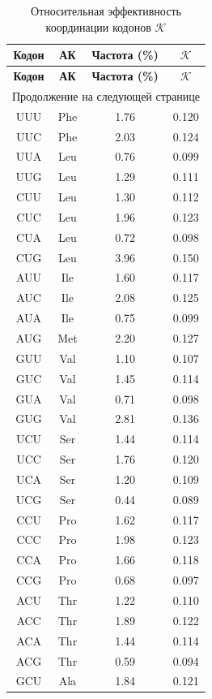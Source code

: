 \documentclass[12pt,a4paper]{article}
\newcommand{\REL}{\mathcal{K}}          %
\begin{document}
	\begin{longtable}{|c|c|c|c|}
		\caption{Относительная эффективность координации кодонов \(\REL\)}\label{tab:codons}\\
		\hline
		\textbf{Кодон} & \textbf{АК} & \textbf{Частота (\%)} & \(\REL\) \\
		\hline
		\endfirsthead
		\hline
		\textbf{Кодон} & \textbf{АК} & \textbf{Частота (\%)} & \(\REL\) \\
		\hline
		\endhead
		\hline
		\multicolumn{4}{r}{Продолжение на следующей странице}\\
		\endfoot
		\hline
		\endlastfoot
		UUU & Phe & 1.76 & 0.120 \\
		UUC & Phe & 2.03 & 0.124 \\
		UUA & Leu & 0.76 & 0.099 \\
		UUG & Leu & 1.29 & 0.111 \\
		CUU & Leu & 1.30 & 0.112 \\
		CUC & Leu & 1.96 & 0.123 \\
		CUA & Leu & 0.72 & 0.098 \\
		CUG & Leu & 3.96 & 0.150 \\
		AUU & Ile & 1.60 & 0.117 \\
		AUC & Ile & 2.08 & 0.125 \\
		AUA & Ile & 0.75 & 0.099 \\
		AUG & Met & 2.20 & 0.127 \\
		GUU & Val & 1.10 & 0.107 \\
		GUC & Val & 1.45 & 0.114 \\
		GUA & Val & 0.71 & 0.098 \\
		GUG & Val & 2.81 & 0.136 \\
		UCU & Ser & 1.44 & 0.114 \\
		UCC & Ser & 1.76 & 0.120 \\
		UCA & Ser & 1.20 & 0.109 \\
		UCG & Ser & 0.44 & 0.089 \\
		CCU & Pro & 1.62 & 0.117 \\
		CCC & Pro & 1.98 & 0.123 \\
		CCA & Pro & 1.66 & 0.118 \\
		CCG & Pro & 0.68 & 0.097 \\
		ACU & Thr & 1.22 & 0.110 \\
		ACC & Thr & 1.89 & 0.122 \\
		ACA & Thr & 1.44 & 0.114 \\
		ACG & Thr & 0.59 & 0.094 \\
		GCU & Ala & 1.84 & 0.121 \\

\end{longtable}
\end{document}
